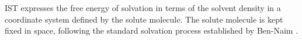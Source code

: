 \documentclass[9pt,tutorial]{livecoms}
\begin{document}

IST expresses the free energy of solvation in terms of the solvent density in a coordinate system defined by the solute molecule.
The solute molecule is kept fixed in space, following the standard solvation process established by Ben-Naim \cite{ben-naim-book}.
\end{document}

